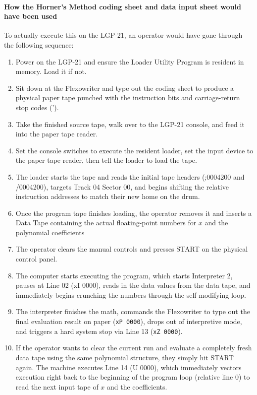 \paragraph{How the Horner's Method coding sheet and data input sheet would have been used}
To actually execute this on the LGP-21, an operator would have gone through the following sequence:
\begin{enumerate}
	\item Power on the LGP-21 and ensure the Loader Utility Program is resident in memory. Load it if not.
	\item Sit down at the Flexowriter and type out the coding sheet to produce a physical paper tape punched with the instruction bits and carriage-return stop codes (').
	\item Take the finished source tape, walk over to the LGP-21 console, and feed it into the paper tape reader.
	\item Set the console switches to execute the resident loader, set the input device to the paper tape reader, then tell the loader to load the tape.
	\item The loader starts the tape and reads the initial tape headers (;0004200 and /0004200), targets Track 04 Sector 00, and begins shifting the relative instruction addresses to match their new home on the drum.
	\item Once the program tape finishes loading, the operator removes it and inserts a Data Tape containing the actual floating-point numbers for $x$ and the polynomial coefficients
	\item The operator clears the manual controls and presses \textsf{START} on the physical control panel.
	\item The computer starts executing the program, which starts Interpreter 2, pauses at Line 02 (xI 0000), reads in the data values from the data tape, and immediately begins crunching the numbers through the self-modifying loop.
	\item The interpreter finishes the math, commands the Flexowriter to type out the final evaluation result on paper (\texttt{xP 0000}), drops out of interpretive mode, and triggers a hard system stop via Line 13 (\texttt{xZ 0000}).
	\item If the operator wants to clear the current run and evaluate a completely fresh data tape using the same polynomial structure, they simply hit \textsf{START} again. The machine executes Line 14 (\textsf{U 0000}), which immediately vectors execution right back to the beginning of the program loop (relative line 0) to read the next input tape of $x$ and the coefficients. 
\end{enumerate}
\newpage